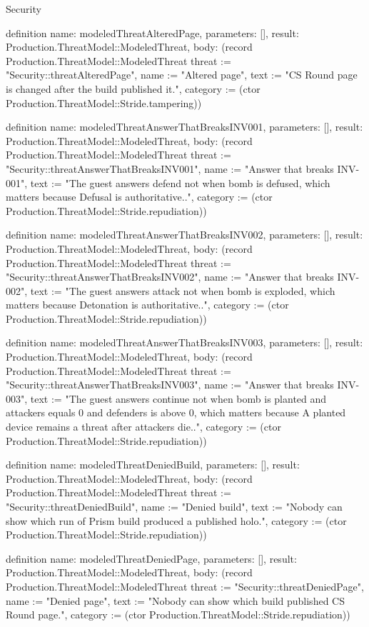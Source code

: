 \begin{lexlean}{Security}
\begin{semanticmodule}
definition{
  name: modeledThreatAlteredPage,
  parameters: [],
  result: Production.ThreatModel::ModeledThreat,
  body: (record Production.ThreatModel::ModeledThreat {threat := "Security::threatAlteredPage", name := "Altered page", text := "CS Round page is changed after the build published it.", category := (ctor Production.ThreatModel::Stride.tampering)})
}

definition{
  name: modeledThreatAnswerThatBreaksINV001,
  parameters: [],
  result: Production.ThreatModel::ModeledThreat,
  body: (record Production.ThreatModel::ModeledThreat {threat := "Security::threatAnswerThatBreaksINV001", name := "Answer that breaks INV-001", text := "The guest answers defend not when bomb is defused, which matters because Defusal is authoritative..", category := (ctor Production.ThreatModel::Stride.repudiation)})
}

definition{
  name: modeledThreatAnswerThatBreaksINV002,
  parameters: [],
  result: Production.ThreatModel::ModeledThreat,
  body: (record Production.ThreatModel::ModeledThreat {threat := "Security::threatAnswerThatBreaksINV002", name := "Answer that breaks INV-002", text := "The guest answers attack not when bomb is exploded, which matters because Detonation is authoritative..", category := (ctor Production.ThreatModel::Stride.repudiation)})
}

definition{
  name: modeledThreatAnswerThatBreaksINV003,
  parameters: [],
  result: Production.ThreatModel::ModeledThreat,
  body: (record Production.ThreatModel::ModeledThreat {threat := "Security::threatAnswerThatBreaksINV003", name := "Answer that breaks INV-003", text := "The guest answers continue not when bomb is planted and attackers equals 0 and defenders is above 0, which matters because A planted device remains a threat after attackers die..", category := (ctor Production.ThreatModel::Stride.repudiation)})
}

definition{
  name: modeledThreatDeniedBuild,
  parameters: [],
  result: Production.ThreatModel::ModeledThreat,
  body: (record Production.ThreatModel::ModeledThreat {threat := "Security::threatDeniedBuild", name := "Denied build", text := "Nobody can show which run of Prism build produced a published holo.", category := (ctor Production.ThreatModel::Stride.repudiation)})
}

definition{
  name: modeledThreatDeniedPage,
  parameters: [],
  result: Production.ThreatModel::ModeledThreat,
  body: (record Production.ThreatModel::ModeledThreat {threat := "Security::threatDeniedPage", name := "Denied page", text := "Nobody can show which build published CS Round page.", category := (ctor Production.ThreatModel::Stride.repudiation)})
}


\end{semanticmodule}
\end{lexlean}

